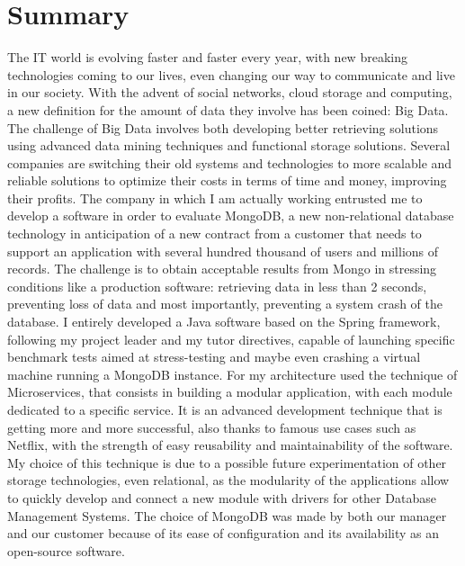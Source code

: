 \chapter*{Summary} %
\label{Summary}


The IT world is evolving faster and faster every year, with new breaking technologies coming to our lives, even changing our way to communicate and live in our society. With the advent of social networks, cloud storage and computing, a new definition for the amount of data they involve has been coined: Big Data.
The challenge of Big Data involves both developing better retrieving solutions using advanced data mining techniques and functional storage solutions.
Several companies are switching their old systems and technologies to more scalable and reliable solutions to optimize their costs in terms of time and money, improving their profits.
The company in which I am actually working entrusted me to develop a software in order to evaluate MongoDB, a new non-relational database technology in  anticipation of a new  contract from a customer that needs to support an application with several hundred thousand of users and millions of records.
The challenge is to obtain acceptable results from Mongo in stressing conditions like a production software: retrieving data in less than 2 seconds, preventing loss of data and most importantly, preventing a system crash of the database.
I entirely developed a Java software based on the Spring framework, following my project leader and my tutor directives, capable of launching specific benchmark tests aimed at stress-testing and maybe even crashing a virtual machine running a MongoDB instance.
For my architecture used the technique of Microservices, that consists in building a modular application, with each module dedicated to a specific service. It is an advanced development technique that is getting more and more successful, also thanks to famous use cases such as Netflix, with the strength of easy reusability and maintainability of the software.
My choice of this technique is due to a possible future experimentation of other storage technologies, even relational, as the modularity of the applications allow to quickly develop and connect a new module with drivers for other Database Management Systems.
The choice of MongoDB was made by both our manager and our customer because of its ease of configuration and its availability as 
an open-source software.





